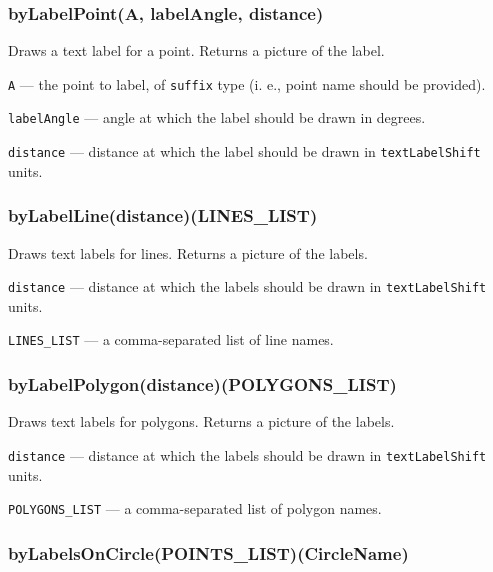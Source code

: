 \documentclass{ltxdoc}
\begin{document}

\subsubsection{byLabelPoint(A, labelAngle, distance)}\label{byLabelPoint}
Draws a text label for a point. Returns a picture of the label.
	
	\texttt{A} — the point to label, of \texttt{suffix} type (i. e., point name should be provided).
	
	\texttt{labelAngle} — angle at which the label should be drawn in degrees.
	
	\texttt{distance} — distance at which the label should be drawn in \texttt{textLabelShift} units.

\subsubsection{byLabelLine(distance)(LINES\_LIST)}\label{byLabelLine}
	
	Draws text labels for lines. Returns a picture of the labels.
	
	\texttt{distance} — distance at which the labels should be drawn in \texttt{textLabelShift} units.
	
	\texttt{LINES\_LIST} — a comma-separated list of line names.

\subsubsection{byLabelPolygon(distance)(POLYGONS\_LIST)}\label{byLabelPolygon}
	
	Draws text labels for polygons. Returns a picture of the labels.
	
	\texttt{distance} — distance at which the labels should be drawn in \texttt{textLabelShift} units.
	
	\texttt{POLYGONS\_LIST} — a comma-separated list of polygon names.


\subsubsection{byLabelsOnCircle(POINTS\_LIST)(CircleName)}\label{byLabelsOnCircle}
	
\end{document}
